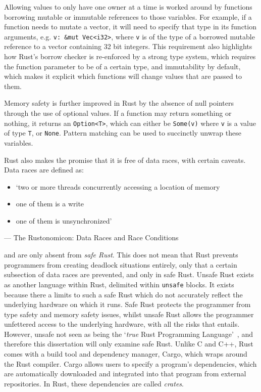 Allowing values to only have one owner at a time is worked around by functions borrowing mutable or immutable references to those variables. For example, if a function needs to mutate a vector, it will need to specify that type in its function arguments, e.g. \texttt{v: \&mut Vec<i32>}, where \texttt{v} is of the type of a borrowed mutable reference to a vector containing 32 bit integers.
This requirement also highlights how Rust's borrow checker is re-enforced by a strong type system, which requires the function parameter to be of a certain type, and immutability by default, which makes it explicit which functions will change values that are passed to them.

Memory safety is further improved in Rust by the absence of null pointers through the use of optional values. If a function may return something or nothing, it returns an \texttt{Option<T>}, which can either be \texttt{Some(v)} where \texttt{v} is a value of type \texttt{T}, or \texttt{None}. Pattern matching can be used to succinctly unwrap these variables.

Rust also makes the promise that it is free of data races, with certain caveats. Data races are defined as:
\begin{itemize}
    \item `two or more threads concurrently accessing a location of memory
    \item one of them is a write
    \item one of them is unsynchronized'
\end{itemize}
\begin{flushright}
--- The Rustonomicon: Data Races and Race Conditions~\cite{NomRace}
\end{flushright}

and are only absent from {\em safe Rust}. This does not mean that Rust prevents programmers from creating deadlock situations entirely, only that a certain subsection of data races are prevented, and only in safe Rust.
Unsafe Rust exists as another language within Rust, delimited within \texttt{unsafe} blocks. It exists because there a limits to such a safe Rust which do not accurately reflect the underlying hardware on which it runs. Safe Rust protects the programmer from type safety and memory safety issues, whilst unsafe Rust allows the programmer unfettered access to the underlying hardware, with all the risks that entails.
However, unsafe not seen as being the `\textit{true} Rust Programming Language'~\cite{NomSafe}, and therefore this dissertation will only examine safe Rust. 
Unlike C and C++, Rust comes with a build tool and dependency manager, Cargo, which wraps around the Rust compiler. Cargo allows users to specify a program's dependencies, which are automatically downloaded and integrated into that program from external repositories. In Rust, these dependencies are called {\em crates}.

